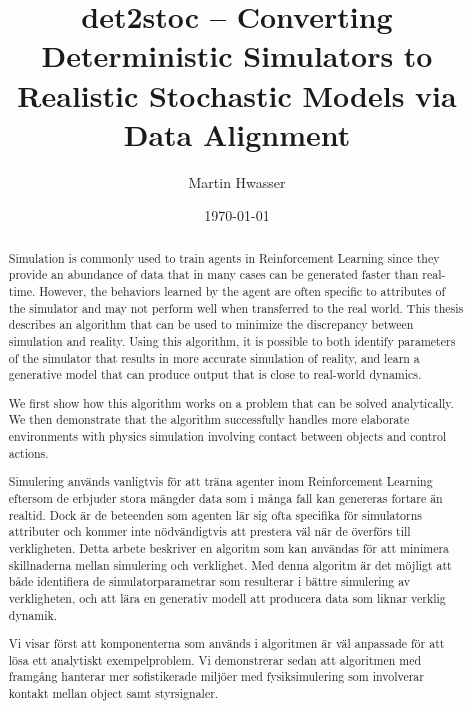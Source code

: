 \documentclass{kththesis}
\title{det2stoc -- Converting Deterministic Simulators to Realistic Stochastic Models via Data Alignment}
\author{Martin Hwasser}
\date{\today}
\begin{document}
\frontmatter
\titlepage
\begin{abstract}
Simulation is commonly used to train agents in Reinforcement Learning since they provide an abundance of data that in many cases can be generated faster than real-time. However, the behaviors learned by the agent are often specific to attributes of the simulator and may not perform well when transferred to the real world. This thesis describes an algorithm that can be used to minimize the discrepancy between simulation and reality. Using this algorithm, it is possible to both identify parameters of the simulator that results in more accurate simulation of reality, and learn a generative model that can produce output that is close to real-world dynamics.

We first show how this algorithm works on a problem that can be solved analytically. We then demonstrate that the algorithm successfully handles more elaborate environments with physics simulation involving contact between objects and control actions.

\end{abstract}
\begin{otherlanguage}{swedish}
  \begin{abstract}
    Simulering används vanligtvis för att träna agenter inom Reinforcement Learning eftersom de erbjuder stora mängder data som i många fall kan genereras fortare än realtid. Dock är de beteenden som agenten lär sig ofta specifika för simulatorns attributer och kommer inte nödvändigtvis att prestera väl när de överförs till verkligheten. Detta arbete beskriver en algoritm som kan användas för att minimera skillnaderna mellan simulering och verklighet. Med denna algoritm är det möjligt att både identifiera de simulatorparametrar som resulterar i bättre simulering av verkligheten, och att lära en generativ modell att producera data som liknar verklig dynamik.
    
    Vi visar först att komponenterna som används i algoritmen är väl anpassade för att lösa ett analytiskt exempelproblem. Vi demonstrerar sedan att algoritmen med framgång hanterar mer sofistikerade miljöer med fysiksimulering som involverar kontakt mellan object samt styrsignaler.
  \end{abstract}
\end{otherlanguage}
\end{document}
